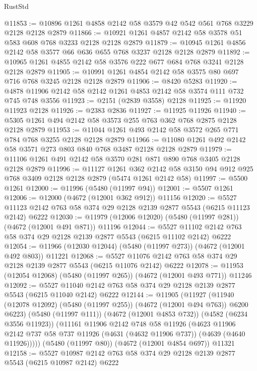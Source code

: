 \begin{lexlean}{RustStd}
\begin{coremodule}
@11853 := @10896 @1261 @4858 @2142 @58 @3579 @42 @542 @561 @768 @3229 @2128 @2128 @2879
@11866 := @10921 @1261 @4857 @2142 @58 @3578 @51 @583 @608 @768 @3233 @2128 @2128 @2879
@11879 := @10945 @1261 @4856 @2142 @58 @3577 @66 @636 @655 @768 @3237 @2128 @2128 @2879
@11892 := @10965 @1261 @4855 @2142 @58 @3576 @222 @677 @684 @768 @3241 @2128 @2128 @2879
@11905 := @10991 @1261 @4854 @2142 @58 @3575 @80 @697 @716 @768 @3245 @2128 @2128 @2879
@11906 := @8420 @5283
@11920 := @4878 @11906 @2142 @58 @2142 @1261 @4853 @2142 @58 @3574 @111 @732 @745 @748 @3556
@11923 := @2151 (@2839 @3558) @2128
@11925 := @11920 @11923 @2128
@11926 := @2383 @2836
@11927 := @11925 @11926
@11940 := @5305 @1261 @494 @2142 @58 @3573 @255 @763 @362 @768 @2875 @2128 @2128 @2879
@11953 := @11044 @1261 @493 @2142 @58 @3572 @265 @771 @784 @768 @3255 @2128 @2128 @2879
@11966 := @11080 @1261 @492 @2142 @58 @3571 @273 @803 @840 @768 @3487 @2128 @2128 @2879
@11979 := @11106 @1261 @491 @2142 @58 @3570 @281 @871 @890 @768 @3405 @2128 @2128 @2879
@11996 := @11127
    @1261
    @362
    @2142
    @58
    @3150
    @94
    @912
    @925
    @768
    @3409
    @2128
    @2128
    @2879
    (@5474 @1261 @2142 @58)
@11997 := @5500 @1261
@12000 := @11996 (@5480 (@11997 @94))
@12001 := @5507 @1261
@12006 := @12000 (@4672 (@12001 @362 @912)) @11156
@12020 := @5527 @11123 @2142 @763 @58 @374 @29 @2128 @2139 @2877 @5543 (@6215 @11123 @2142) @6222
@12030 := @11979 (@12006 @12020) (@5480 (@11997 @281)) (@4672 (@12001 @491 @871)) @11196
@12044 := @5527 @11102 @2142 @763 @58 @374 @29 @2128 @2139 @2877 @5543 (@6215 @11102 @2142) @6222
@12054 := @11966 (@12030 @12044) (@5480 (@11997 @273)) (@4672 (@12001 @492 @803)) @11221
@12068 := @5527 @11076 @2142 @763 @58 @374 @29 @2128 @2139 @2877 @5543 (@6215 @11076 @2142) @6222
@12078 := @11953 (@12054 @12068) (@5480 (@11997 @265)) (@4672 (@12001 @493 @771)) @11246
@12092 := @5527 @11040 @2142 @763 @58 @374 @29 @2128 @2139 @2877 @5543 (@6215 @11040 @2142) @6222
@12144 := @11905
    (@11927
      (@11940 (@12078 @12092) (@5480 (@11997 @255)) (@4672 (@12001 @494 @763)) @6200 @6223)
      (@5480 (@11997 @111))
      (@4672 (@12001 @4853 @732))
      (@4582 (@6234 @3556 @11923))
      (@11161
        @11906
        @2142
        @748
        @58
        @11926
        (@4623
          @11906
          @2142
          @737
          @58
          @737
          @11926
          (@4631 (@4632 @11906 @737))
          (@4639 (@4640 @11926)))))
    (@5480 (@11997 @80))
    (@4672 (@12001 @4854 @697))
    @11321
@12158 := @5527 @10987 @2142 @763 @58 @374 @29 @2128 @2139 @2877 @5543 (@6215 @10987 @2142) @6222

\end{coremodule}
\end{lexlean}
